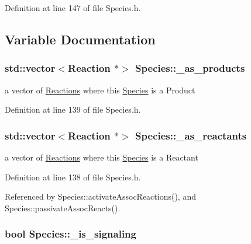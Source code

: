 Definition at line 147 of file Species.\-h.



\subsection{Variable Documentation}
\hypertarget{group__Chemistry_ga11b0027a9ca5ac5eb457f2ec64ec28fe}{
\subsubsection[{\-\_\-as\-\_\-products}]{\setlength{\rightskip}{0pt plus 5cm}std\-::vector$<${\bf Reaction} $\ast$$>$ {\bf Species\-::\-\_\-as\-\_\-products}}}\label{group__Chemistry_ga11b0027a9ca5ac5eb457f2ec64ec28fe}


a vector of \hyperlink{classReaction}{Reactions} where this \hyperlink{classSpecies}{Species} is a Product 



Definition at line 139 of file Species.\-h.

\hypertarget{group__Chemistry_gaa994e09514c87bde421fd6af1ccc54c0}{
\subsubsection[{\-\_\-as\-\_\-reactants}]{\setlength{\rightskip}{0pt plus 5cm}std\-::vector$<${\bf Reaction} $\ast$$>$ {\bf Species\-::\-\_\-as\-\_\-reactants}}}\label{group__Chemistry_gaa994e09514c87bde421fd6af1ccc54c0}


a vector of \hyperlink{classReaction}{Reactions} where this \hyperlink{classSpecies}{Species} is a Reactant 



Definition at line 138 of file Species.\-h.



Referenced by Species\-::activate\-Assoc\-Reactions(), and Species\-::passivate\-Assoc\-Reacts().

\hypertarget{group__Chemistry_ga0cc46a3518db8b9e682d1f8544530daf}{
\subsubsection[{\-\_\-is\-\_\-signaling}]{\setlength{\rightskip}{0pt plus 5cm}bool {\bf Species\-::\-\_\-is\-\_\-signaling}}}\label{group__Chemistry_ga0cc46a3518db8b9e682d1f8544530daf}


